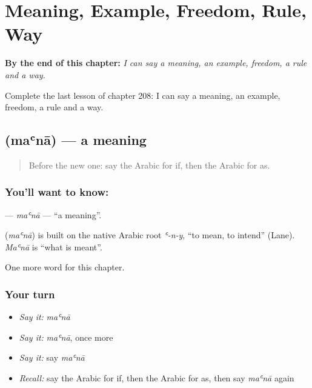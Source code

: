
\chapter{Meaning, Example, Freedom, Rule, Way}
\label{ch:ar-meaning-example-freedom-rule-way}

\begin{chapteropening}
\textbf{By the end of this chapter:} \emph{I can say a meaning, an example, freedom, a rule and a way.}

Complete the last lesson of chapter 208: I can say a meaning, an example, freedom, a rule and a way.
\end{chapteropening}

\section[\texorpdfstring{\ar{معنى} (maʿnā)}{معنى (maʿnā)}]{ (maʿnā) — a meaning}

\label{lesson:AR-C208-mana}



\begin{quote}
Before the new one: say the Arabic for if, then the Arabic for as.
\end{quote}

\subsection*{You'll want to know: }
\textbf{} — \emph{maʿnā} — \textquotedblleft{}a meaning\textquotedblright{}.

\begin{cousinweb}
\textbf{} (\emph{maʿnā}) is built on the native Arabic root \emph{ʿ-n-y}, \textquotedblleft{}to mean, to intend\textquotedblright{} (Lane). \emph{Maʿnā} is \textquotedblleft{}what is meant\textquotedblright{}.
\end{cousinweb}

\begin{grammarlens}[title={What you've built}]
One more word for this chapter.
\end{grammarlens}

\subsection*{Your turn}
\begin{itemize}
\raggedright
  \item \emph{Say it:} \emph{maʿnā}
  \item \emph{Say it:} \emph{maʿnā}, once more
  \item \emph{Say it:} say \emph{maʿnā}
  \item \emph{Recall:} say the Arabic for if, then the Arabic for as, then say \emph{maʿnā} again
\end{itemize}

